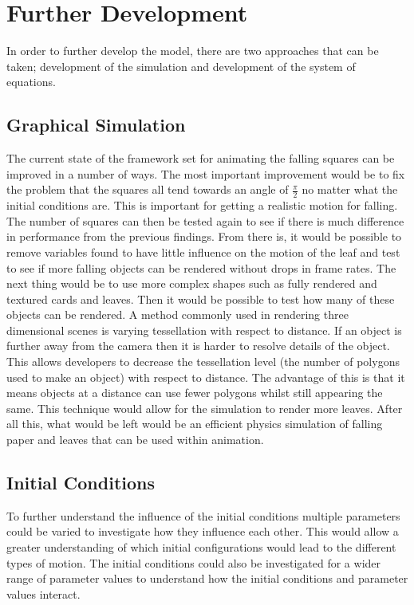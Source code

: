 \section{Further Development}

In order to further develop the model, there are two approaches that can be taken; development of the simulation and development of the system of equations. 


\subsection{Graphical Simulation}

The current state of the framework set for animating the falling squares can be improved in a number of ways. The most important improvement would be to fix the problem that the squares all tend towards an angle of $\frac{\pi}{2}$ no matter what the initial conditions are. This is important for getting a realistic motion for falling. The number of squares can then be tested again to see if there is much difference in performance from the previous findings. From there is, it would be possible to remove variables found to have little influence on the motion of the leaf and test to see if more falling objects can be rendered without drops in frame rates. The next thing would be to use more complex shapes such as fully rendered and textured cards and leaves. Then it would be possible to test how many of these objects can be rendered. A method commonly used in rendering three dimensional scenes is varying tessellation with respect to distance. If an object is further away from the camera then it is harder to resolve details of the object. This allows developers to decrease the tessellation level (the number of polygons used to make an object) with respect to distance. The advantage of this is that it means objects at a distance can use fewer polygons whilst still appearing the same. This technique would allow for the simulation to render more leaves. After all this, what would be left would be an efficient physics simulation of falling paper and leaves that can be used within animation.

\subsection{Initial Conditions}
To further understand the influence of the initial conditions multiple parameters could be varied to investigate how they influence each other. This would allow a greater understanding of which initial configurations would lead to the different types of motion. The initial conditions could also be investigated for a wider range of parameter values to understand how the initial conditions and parameter values interact.

